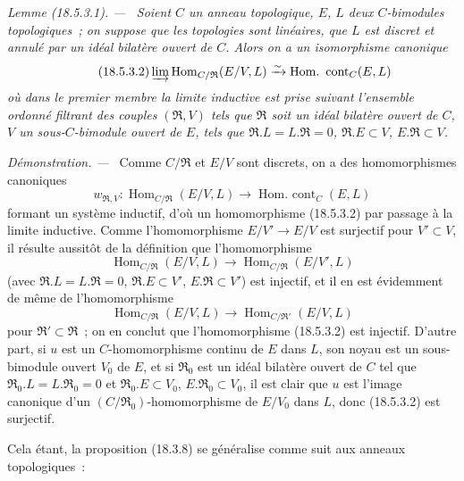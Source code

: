 \documentclass[10pt,oneside]{book}
\makeatletter
\newcommand{\setmanualcurrentlabel}[1]{\def\@currentlabel{#1}}
\newenvironment{lemma}[1][]{%
  \setmanualcurrentlabel{#1}\par\medskip\noindent\itshape Lemme (#1). ---\ }{\par}
\newenvironment{proof}{%
  \par\medskip\noindent\textit{Démonstration. ---\ }}{\par}
\makeatother
\begin{document}
\begin{lemma}[18.5.3.1]
\label{0.18.5.3.1-fr}
Soient $C$ un anneau topologique, $E$, $L$ deux $C$-bimodules topologiques~;
on suppose que les topologies sont linéaires, que $L$ est discret et annulé
par un idéal bilatère ouvert de $C$. Alors on a un isomorphisme canonique
\begin{equation}
\label{0.18.5.3.2-fr}
\tag{18.5.3.2}
  \varinjlim\operatorname{Hom}_{C/\mathfrak R}(E/V,L)
  \xrightarrow{\sim}\operatorname{Hom.\ cont}_C(E,L)
\end{equation}
où dans le premier membre la limite inductive est prise suivant l'ensemble
ordonné filtrant des couples $(\mathfrak R,V)$ tels que $\mathfrak R$ soit un
idéal bilatère ouvert de $C$, $V$ un sous-$C$-bimodule ouvert de $E$, tels que
$\mathfrak R.L=L.\mathfrak R=0$, $\mathfrak R.E\subset V$,
$E.\mathfrak R\subset V$.
\end{lemma}

\begin{proof}
Comme $C/\mathfrak R$ et $E/V$ sont discrets, on a des homomorphismes
canoniques
\[
  w_{\mathfrak R,V}:\operatorname{Hom}_{C/\mathfrak R}(E/V,L)
  \longrightarrow\operatorname{Hom.\ cont}_C(E,L)
\]
formant un système inductif, d'où un homomorphisme (18.5.3.2) par passage à la
limite inductive. Comme l'homomorphisme $E/V'\to E/V$ est surjectif pour
$V'\subset V$, il résulte aussitôt de la définition que l'homomorphisme
\[
  \operatorname{Hom}_{C/\mathfrak R}(E/V,L)
  \longrightarrow\operatorname{Hom}_{C/\mathfrak R}(E/V',L)
\]
(avec $\mathfrak R.L=L.\mathfrak R=0$, $\mathfrak R.E\subset V'$,
$E.\mathfrak R\subset V'$) est injectif, et il en est évidemment de même de
l'homomorphisme
\[
  \operatorname{Hom}_{C/\mathfrak R}(E/V,L)
  \longrightarrow\operatorname{Hom}_{C/\mathfrak R'}(E/V,L)
\]
pour $\mathfrak R'\subset\mathfrak R$~; on en conclut que l'homomorphisme
(18.5.3.2) est injectif. D'autre part, si $u$ est un $C$-homomorphisme continu
de $E$ dans $L$, son noyau est un sous-bimodule ouvert $V_0$ de $E$, et si
$\mathfrak R_0$ est un idéal bilatère ouvert de $C$ tel que
$\mathfrak R_0.L=L.\mathfrak R_0=0$ et $\mathfrak R_0.E\subset V_0$,
$E.\mathfrak R_0\subset V_0$, il est clair que $u$ est l'image canonique d'un
$(C/\mathfrak R_0)$-homomorphisme de $E/V_0$ dans $L$, donc (18.5.3.2) est
surjectif.
\end{proof}

Cela étant, la proposition (18.3.8) se généralise comme suit aux anneaux
topologiques~:
\end{document}
